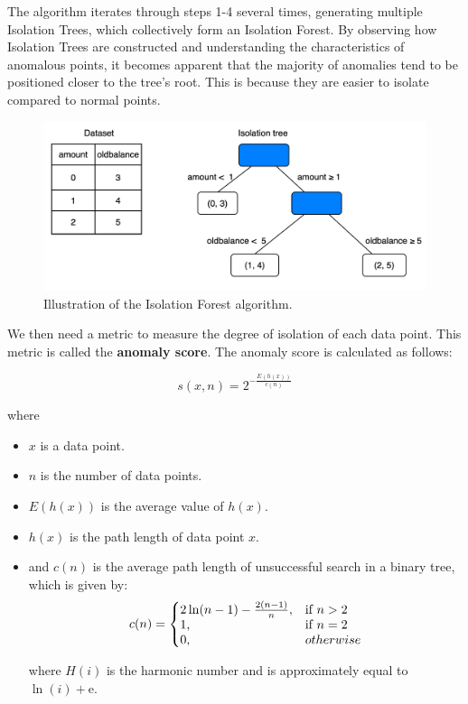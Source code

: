 The algorithm iterates through steps 1-4 several times, generating multiple Isolation Trees, which collectively form an Isolation Forest. By observing how Isolation Trees are constructed and understanding the characteristics of anomalous points, it becomes apparent that the majority of anomalies tend to be positioned closer to the tree's root. This is because they are easier to isolate compared to normal points.

\begin{figure}[H]
  \centering
  \includegraphics[width=\linewidth]{body/02_methodology/img/figure6.png}
  \caption{Illustration of the Isolation Forest algorithm.}
\end{figure}

We then need a metric to measure the degree of isolation of each data point. This metric is called the \textbf{anomaly score}. The anomaly score is calculated as follows:

\begin{equation}
    s(x, n) = 2^{-\frac{E(h(x))}{c(n)}}
\end{equation}

where 

\begin{itemize}
  \item $x$ is a data point.
  \item $n$ is the number of data points.
  \item $E(h(x))$ is the average value of $h(x)$.
  \item $h(x)$ is the path length of data point $x$.
  \newpage
  \item and $c(n)$ is the average path length of unsuccessful search in a binary tree, which is given by:
  \begin{equation}
    c(n)=\left\{
    \begin{array}{@{}ll@{}}
      2\ln(n-1) - \frac{2(n-1)}{n}, & \textrm{if } n>2 \\
      1, & \textrm{if } n=2 \\
      0, & otherwise
    \end{array}\right.
  \end{equation} 

where $H(i)$ is the harmonic number and is approximately equal to $\ln(i) + \mathrm{e}$.
\end{itemize}

